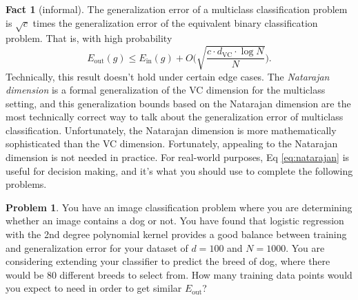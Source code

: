 \documentclass[10pt]{exam}
\theoremstyle{definition}
\newtheorem{problem}{Problem}
\newtheorem{fact}{Fact}
\newcommand{\Ein}{E_{\text{in}}}
\newcommand{\Eout}{E_{\text{out}}}
\newcommand{\dvc}{{d_{\text{VC}}}}
\begin{document}
\begin{fact}[informal]
    The generalization error of a multiclass classification problem is $\sqrt{c}$ times the generalization error of the equivalent binary classification problem.
    That is, with high probability
    \begin{equation}
        \label{eq:natarajan}
        \Eout(g) \le \Ein(g) + O\bigg(\sqrt{\frac{c\cdot\dvc\cdot \log N}{N}}\bigg).
    \end{equation}
    Technically, this result doesn't hold under certain edge cases.
    The \emph{Natarajan dimension} is a formal generalization of the VC dimension for the multiclass setting,
    and this generalization bounds based on the Natarajan dimension are the most technically correct way to talk about the generalization error of multiclass classification.
    Unfortunately, the Natarajan dimension is more mathematically sophisticated than the VC dimension.
    Fortunately, appealing to the Natarajan dimension is not needed in practice.
    For real-world purposes, Eq \ref{eq:natarajan} is useful for decision making,
    and it's what you should use to complete the following problems.
\end{fact}

\begin{problem}
You have an image classification problem where you are determining whether an image contains a dog or not.
You have found that logistic regression with the 2nd degree polynomial kernel provides a good balance between training and generalization error for your dataset of $d=100$ and $N=1000$.
You are considering extending your classifier to predict the breed of dog,
where there would be 80 different breeds to select from.
How many training data points would you expect to need in order to get similar $\Eout$?
\end{problem}
\end{document}
